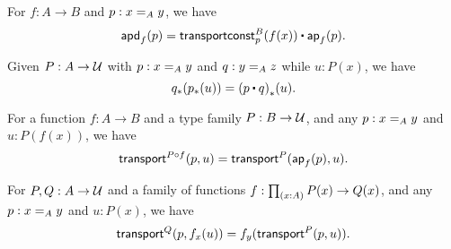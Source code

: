 \documentclass[hott-all.tex]{subfiles}
\begin{document}
\begin{lem}\label{thm:apd-const}
  For $f:A\to B$ and $p:\id[A]xy$, we have
  \[ \apdfunc f(p) = \transconst B p{f(x)} \ct \apfunc f (p). \]
\end{lem}
%
%
%

\begin{lem}\label{thm:transport-concat}
  Given $P:A\to\type$ with $p:\id[A]xy$ and $q:\id[A]yz$ while $u:P(x)$, we have
  \[ \trans{q}{\trans{p}{u}} = \trans{(p\ct q)}{u}. \]
\end{lem}

\begin{lem}\label{thm:transport-compose}
  For a function $f:A\to B$ and a type family $P:B\to\type$, and any $p:\id[A]xy$ and $u:P(f(x))$, we have
  \[ \transfib{P\circ f}{p}{u} = \transfib{P}{\apfunc f(p)}{u}. \]
\end{lem}

\begin{lem}\label{thm:ap-transport}
  For $P,Q:A\to \type$ and a family of functions $f:\prd{x:A} P(x)\to Q(x)$, and any $p:\id[A]xy$ and $u:P(x)$, we have
  \[ \transfib{Q}{p}{f_x(u)} = f_y(\transfib{P}{p}{u}). \]
\end{lem}
\end{document}
